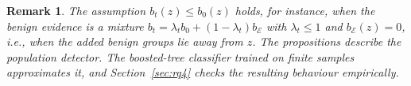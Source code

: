 \documentclass[preprint,12pt]{elsarticle}
\newtheorem{remark}{Remark}
\newcommand{\E}{\mathcal{E}}
\begin{document}
\begin{remark}
The assumption $b_t(z)\le b_0(z)$ holds, for instance, when the benign evidence is a mixture $b_t=\lambda_t b_0+(1-\lambda_t)b_{\E}$ with $\lambda_t\le1$ and $b_{\E}(z)=0$, i.e., when the added benign groups lie away from $z$. The propositions describe the population detector. The boosted-tree classifier trained on finite samples approximates it, and Section~\ref{sec:rq4} checks the resulting behaviour empirically.
\end{remark}



\end{document}
